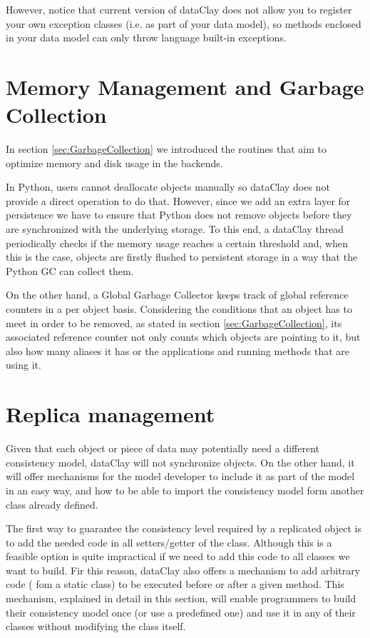 However, notice that current version of dataClay does not allow you to register your own exception classes (i.e. as part of your data model), so methods enclosed in your data model can only throw language built-in exceptions.

\section {Memory Management and Garbage Collection}

In section \ref{sec:GarbageCollection} we introduced the routines that aim to optimize memory and disk usage in the backends.

In Python, users cannot deallocate objects manually so dataClay does not provide a direct operation to do that. However, since we add an extra layer for persistence we have to ensure that Python does not remove objects before they are synchronized with the underlying storage. To this end, a dataClay thread periodically checks if the memory usage reaches a certain threshold and, when this is the case, objects are firstly flushed to persistent storage in a way that the Python GC can collect them.

On the other hand, a Global Garbage Collector keeps track of global reference counters in a per object basis. Considering the conditions that an object has to meet in order to be removed, as stated in section \ref{sec:GarbageCollection}, its associated reference counter not only counts which objects are pointing to it, but also how many aliases it has or the applications and running methods that are using it.

\section{Replica management}
\label{sec:PythonReplication}

Given that each object or piece of data may potentially need a different consistency model, dataClay will not synchronize objects. On the other hand, it will offer mechanisms for the model developer to include it as part of the model in an easy way, and how to be able to import the consistency model form another class already defined.

The first way to guarantee the consistency level required by a replicated object is to add the needed code in all setters/getter of the class. Although this is a feasible option is quite impractical if we need to add this code to all classes we want to build. Fir this reason, dataClay also offers a mechanism to add arbitrary code ( fom a static class) to be executed before or after a given method. This mechanism, explained in detail in this section, will enable programmers to build their consistency model once (or use a predefined one) and use it in any of their classes without modifying the class itself.

